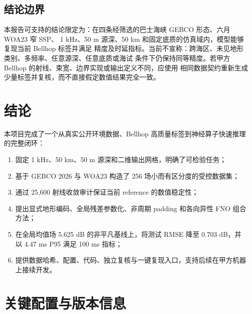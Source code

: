 \documentclass[UTF8,11pt]{ctexart}
\newcommand{\BestRMSE}{0.703}
\newcommand{\GlobalBaseline}{5.625}
\newcommand{\GpuPninetyfive}{4.47}
\begin{document}
\subsection{结论边界}

本报告可支持的结论限定为：在四条经筛选的巴士海峡 GEBCO 形态、六月 WOA23 窄 SSP、
1 kHz、50 m 源深、50 km 和固定底质的仿真域内，模型能够复现当前 Bellhop 标签并满足
精度及时延指标。当前不宣称：跨海区、未见地形类别、多频率、任意源深、任意底质或海试
条件下仍保持同等精度。若甲方 Bellhop 的射线、束宽、边界实现或输出定义不同，应使用
相同数据契约重新生成少量标签并复核，而不直接假定数值结果完全一致。

\section{结论}

本项目完成了一个从真实公开环境数据、Bellhop 高质量标签到神经算子快速推理的完整闭环：
\begin{enumerate}
  \item 固定 1 kHz、50 km、50 m 源深和二维输出网格，明确了可检验任务；
  \item 基于 GEBCO 2026 与 WOA23 构造了 256 场小而有区分度的受控数据集；
  \item 通过 25,600 射线收敛审计保证当前 reference 的数值稳定性；
  \item 提出显式地形编码、全局残差参数化、非周期 padding 和各向异性 FNO 组合方法；
  \item 在全局均值场 \GlobalBaseline{} dB 的非平凡基线上，将测试 RMSE 降至
  \BestRMSE{} dB，并以 \GpuPninetyfive{} ms P95 满足 100 ms 指标；
  \item 提供数据哈希、配置、代码、独立复核与一键复现入口，支持后续在甲方机器上接续开发。
\end{enumerate}

\appendix
\section{关键配置与版本信息}
\end{document}
